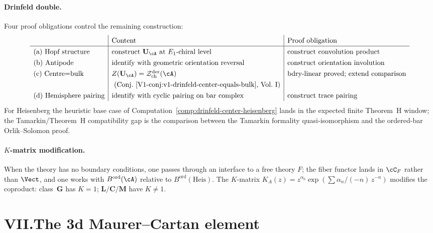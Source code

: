 \paragraph{Drinfeld double.}
Four proof obligations control the remaining construction:
\[
\renewcommand{\arraystretch}{1.3}
\begin{array}{l|l|l}
 & \text{Content} & \text{Proof obligation} \\
\hline
\text{(a) Hopf structure} &
 \text{construct } \mathbf{U}_\cA \text{ at } E_1\text{-chiral level} &
 \text{construct convolution product} \\
\text{(b) Antipode} &
 \text{identify with geometric orientation reversal} &
 \text{construct orientation involution} \\
\text{(c) Centre=bulk} &
 Z(\mathbf{U}_\cA) = \cZ^{\mathrm{der}}_{\mathrm{ch}}(\cA) &
 \text{bdry-linear proved; extend comparison} \\
 & \ \text{(Conj.~\ref{V1-conj:v1-drinfeld-center-equals-bulk}, Vol.~I)} & \\
\text{(d) Hemisphere pairing} &
 \text{identify with cyclic pairing on bar complex} &
 \text{construct trace pairing}
\end{array}
\]
For Heisenberg the heuristic base case of
Computation~\ref{comp:drinfeld-center-heisenberg} lands in the
expected finite Theorem~H window; the Tamarkin/Theorem~H
compatibility gap is the comparison between the Tamarkin formality
quasi-isomorphism and the ordered-bar Orlik--Solomon proof.

\paragraph{$K$-matrix modification.}
When the theory has no boundary conditions, one passes through
an interface to a free theory $F$; the fiber functor lands in
$\cC_F$ rather than $\Vect$, and one works with
$B^{\mathrm{ord}}(\cA)$ relative to $B^{\mathrm{ord}}(\mathrm{Heis})$.
The $K$-matrix
$K_A(z) = z^{\alpha_0} \exp(\sum \alpha_n/({-}n)\, z^{-n})$
modifies the coproduct: class~$\mathbf{G}$ has $K = 1$;
$\mathbf{L}/\mathbf{C}/\mathbf{M}$ have $K \neq 1$.

\section*{VII.\quad The 3d Maurer--Cartan element}

